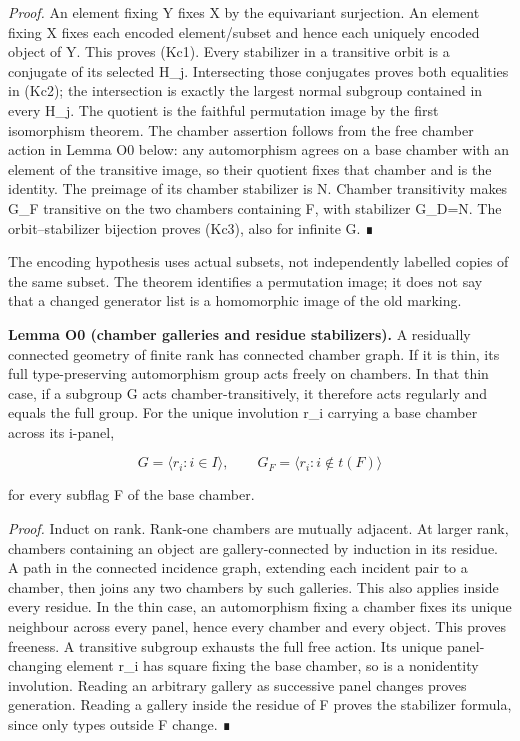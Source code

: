 \documentclass[
  10pt,
  letterpaper,
]{article}
\begin{document}
\emph{Proof.} An element fixing Y fixes X by the equivariant surjection.
An element fixing X fixes each encoded element/subset and hence each
uniquely encoded object of Y. This proves (Kc1). Every stabilizer in a
transitive orbit is a conjugate of its selected H\_j. Intersecting those
conjugates proves both equalities in (Kc2); the intersection is exactly
the largest normal subgroup contained in every H\_j. The quotient is the
faithful permutation image by the first isomorphism theorem. The chamber
assertion follows from the free chamber action in Lemma O0 below: any
automorphism agrees on a base chamber with an element of the transitive
image, so their quotient fixes that chamber and is the identity. The
preimage of its chamber stabilizer is N. Chamber transitivity makes G\_F
transitive on the two chambers containing F, with stabilizer G\_D=N. The
orbit--stabilizer bijection proves (Kc3), also for infinite G. ∎

The encoding hypothesis uses actual subsets, not independently labelled
copies of the same subset. The theorem identifies a permutation image;
it does not say that a changed generator list is a homomorphic image of
the old marking.

\textbf{Lemma O0 (chamber galleries and residue stabilizers).} A
residually connected geometry of finite rank has connected chamber
graph. If it is thin, its full type-preserving automorphism group acts
freely on chambers. In that thin case, if a subgroup G acts
chamber-transitively, it therefore acts regularly and equals the full
group. For the unique involution r\_i carrying a base chamber across its
i-panel,

\[
 G=\langle r_i:i\in I\rangle,
 \qquad G_F=\langle r_i:i\notin t(F)\rangle
 \tag{O0}
\]

for every subflag F of the base chamber.

\emph{Proof.} Induct on rank. Rank-one chambers are mutually adjacent.
At larger rank, chambers containing an object are gallery-connected by
induction in its residue. A path in the connected incidence graph,
extending each incident pair to a chamber, then joins any two chambers
by such galleries. This also applies inside every residue. In the thin
case, an automorphism fixing a chamber fixes its unique neighbour across
every panel, hence every chamber and every object. This proves freeness.
A transitive subgroup exhausts the full free action. Its unique
panel-changing element r\_i has square fixing the base chamber, so is a
nonidentity involution. Reading an arbitrary gallery as successive panel
changes proves generation. Reading a gallery inside the residue of F
proves the stabilizer formula, since only types outside F change. ∎
\end{document}
